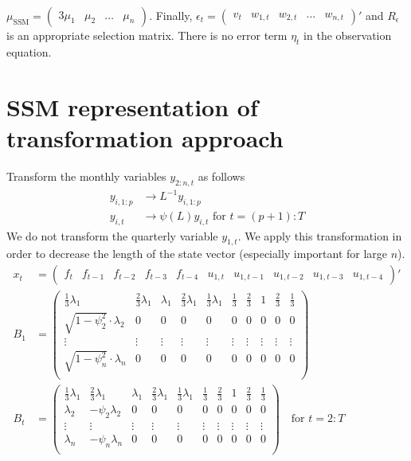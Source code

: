 $\mu_\mathrm{SSM} = \begin{pmatrix} 3\mu_1& \mu_2 & \dots & \mu_n \end{pmatrix}$. Finally, $\epsilon_t = \begin{pmatrix} v_t & w_{1,t} & w_{2,t} & \dots & w_{n,t} \end{pmatrix}'$ and $R_\epsilon$ is an appropriate selection matrix. There is no error term $\eta_t$ in the observation equation.\\

\section{SSM representation of transformation approach}


Transform the monthly variables $y_{2:n,t}$ as follows
\begin{align}
y_{i,1:p} &\rightarrow L^{-1} y_{i,1:p} \\
y_{i,t}   &\rightarrow \psi(L) y_{i,t} \text{ for } t=(p+1):T
\end{align}
We do not transform the quarterly variable $y_{1,t}$. We apply this transformation in order to decrease the length of the state vector (especially important for large $n$).
\begin{align*}
x_t &= \begin{pmatrix}
f_t & f_{t-1} & f_{t-2} & f_{t-3} & f_{t-4} & u_{1,t} & u_{1,t-1} & u_{1,t-2} & u_{1,t-3} & u_{1,t-4}
\end{pmatrix}' \\
B_1 &= \begin{pmatrix}
\frac{1}{3}\lambda_1 & \frac{2}{3}\lambda_1 & \lambda_1 & \frac{2}{3}\lambda_1 & \frac{1}{3} \lambda_1 & \frac{1}{3} & \frac{2}{3} & 1 & \frac{2}{3} & \frac{1}{3} \\
\sqrt{1-\psi_2^2}\cdot\lambda_2 & 0 & 0 & 0 & 0 & 0 & 0 & 0 & 0 & 0 \\
\vdots & \vdots & \vdots & \vdots & \vdots & \vdots & \vdots & \vdots & \vdots & \vdots \\
\sqrt{1-\psi_n^2}\cdot\lambda_n & 0 & 0 & 0 & 0 & 0 & 0 & 0 & 0 & 0 \\
\end{pmatrix} \\
B_t &= \begin{pmatrix}
\frac{1}{3}\lambda_1 & \frac{2}{3}\lambda_1 & \lambda_1 & \frac{2}{3}\lambda_1 & \frac{1}{3} \lambda_1 & \frac{1}{3} & \frac{2}{3} & 1 & \frac{2}{3} & \frac{1}{3} \\
\lambda_2 & -\psi_2\lambda_2 & 0 & 0 & 0 & 0 & 0 & 0 & 0 & 0 \\
\vdots & \vdots & \vdots & \vdots & \vdots & \vdots & \vdots & \vdots & \vdots & \vdots \\
\lambda_n & -\psi_n\lambda_n & 0 & 0 & 0 & 0 & 0 & 0 & 0 & 0 \\
\end{pmatrix} \quad \text{for $t=2:T$}
\end{align*}

